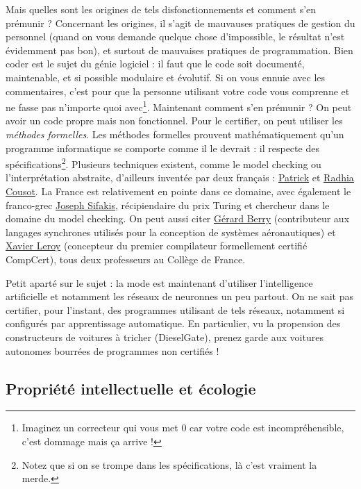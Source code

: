 \documentclass[10pt]{article}
\begin{document}
Mais quelles sont les origines de tels disfonctionnements et comment s'en prémunir ? Concernant les origines, il s'agit de mauvauses pratiques de gestion du
personnel (quand on vous demande quelque chose d'impossible, le résultat n'est évidemment pas bon), et surtout de mauvaises pratiques de programmation.
Bien coder est le sujet du génie logiciel : il faut que le code soit documenté, maintenable, et si possible modulaire et évolutif. Si on vous ennuie
avec les commentaires, c'est pour que la personne utilisant votre code vous comprenne et ne fasse pas n'importe quoi avec\footnote{
  Imaginez un correcteur qui vous met $0$ car votre code est incompréhensible, c'est dommage mais ça arrive !
}. Maintenant comment s'en prémunir ? On peut avoir un code propre mais non fonctionnel. Pour le certifier, on peut utiliser les \emph{méthodes formelles}.
Les méthodes formelles prouvent mathématiquement qu'un programme informatique se comporte comme il le devrait : il respecte des spécifications\footnote{
  Notez que si on se trompe dans les spécifications, là c'est vraiment la merde.}. Plusieurs techniques existent, comme le model checking ou l'interprétation
abstraite, d'ailleurs inventée par deux français : \href{https://fr.wikipedia.org/wiki/Patrick_Cousot}{Patrick} et
\href{https://fr.wikipedia.org/wiki/Radhia_Cousot}{Radhia Cousot}. La France est relativement en pointe dans ce domaine, avec également le franco-grec
\href{https://fr.wikipedia.org/wiki/Joseph_Sifakis}{Joseph Sifakis}, récipiendaire du prix Turing et chercheur dans le domaine du model checking.
On peut aussi citer \href{https://fr.wikipedia.org/wiki/G\%C3\%A9rard_Berry}{Gérard Berry} (contributeur aux langages synchrones utilisés
pour la conception de systèmes aéronautiques) et \href{https://fr.wikipedia.org/wiki/Xavier_Leroy}{Xavier Leroy} (concepteur du premier compilateur
formellement certifié CompCert), tous deux professeurs au Collège de France.

Petit aparté sur le sujet : la mode est maintenant d'utiliser l'intelligence artificielle et notamment les réseaux de neuronnes un peu partout.
On ne sait pas certifier, pour l'instant, des programmes utilisant de tels réseaux, notamment si configurés par apprentissage automatique.
En particulier, vu la propension des constructeurs de voitures à tricher (DieselGate),
prenez garde aux voitures autonomes bourrées de programmes non certifiés !



\subsection{Propriété intellectuelle et écologie}
\end{document}
